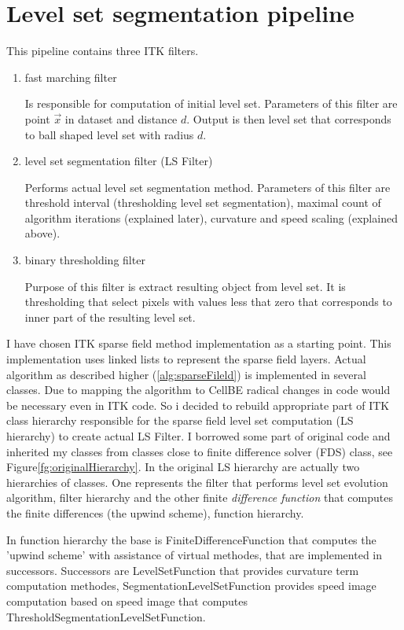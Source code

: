 \section{Level set segmentation pipeline}

This pipeline contains three ITK filters.
\begin{enumerate}
  \item{fast marching filter}
  \par
  Is responsible for computation of initial level set. Parameters of this filter are point $\vec{x}$ in dataset and distance $d$. Output is then level set that corresponds to ball shaped level set with radius $d$.

  \item{level set segmentation filter (LS Filter)}
  \par
  Performs actual level set segmentation method. Parameters of this filter are threshold interval (thresholding level set segmentation),  maximal count of algorithm iterations (explained later), curvature and speed scaling (explained above).

  \item{binary thresholding filter}
  \par
  Purpose of this filter is extract resulting object from level set. It is thresholding that select pixels with values less that zero that corresponds to inner part of the resulting level set.
\end{enumerate}

I have chosen ITK sparse field method implementation as a starting point. This implementation uses linked lists to represent the sparse field layers. Actual algorithm as described higher (\ref{alg:sparseFileld}) is implemented in several classes. Due to mapping the algorithm to CellBE radical changes in code would be necessary even in ITK code. So i decided to rebuild appropriate part of ITK class hierarchy responsible for the sparse field level set computation (LS hierarchy) to create actual LS Filter. I borrowed some part of original code and inherited my classes from classes close to finite difference solver (FDS) class, see Figure\ref{fg:originalHierarchy}. In the original LS hierarchy are actually two hierarchies of classes. One represents the filter that performs level set evolution algorithm, filter hierarchy and the other finite \emph{difference function} that computes the finite differences (the upwind scheme), function hierarchy.
 
In function hierarchy the base is FiniteDifferenceFunction that computes the 'upwind scheme' with assistance of virtual methodes, that are implemented in successors. Successors are LevelSetFunction that provides curvature term computation methodes, SegmentationLevelSetFunction provides speed image computation based on speed image that computes ThresholdSegmentationLevelSetFunction. 

